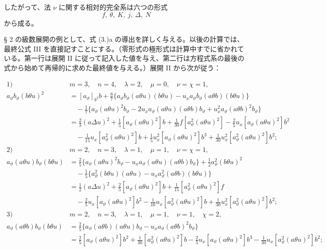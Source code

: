 \documentclass[11pt]{jlreq}
\newcommand{\A}{\Delta}
\begin{document}
したがって、法 $\nu$ に関する相対的完全系は六つの形式
\[
f,\ \theta,\ K,\ j,\ \A,\ N
\]
から成る。

§ 2 の級数展開の例として、式 (3.)a の導出を詳しく与える。以後の計算では、最終公式 III を直接記すことにする。（零形式の極形式は計算中すでに省かれている。第一行は展開 II に従って記入した値を与え、第二行は方程式系の最後の式から始めて再帰的に求めた最終値を与える。）展開 II から次が従う：

\begin{align*}
\text{1)}\quad&m=3,\quad n=4,\quad \lambda=2,\quad \mu=0,\quad \nu=\chi=1,\\
a_\vartheta b_\vartheta(b\theta u)^2
&=[a_\vartheta]_{b^2}b+\frac67\{a_\vartheta b_\vartheta(a\theta u)(b\theta u)-u_xa_\vartheta b_\vartheta(a\theta b)(b\theta u)\}\\
&\quad-\frac17\{a_\vartheta(a\theta u)^2b_\vartheta-2u_xa_\vartheta(a\theta u)(a\theta b)b_\vartheta+u_x^2a_\vartheta(a\theta b)^2b_\vartheta\}\\
&=\frac23(a\Delta u)^2+\frac15[a_\vartheta(a\theta u)^2]b+\frac1{30}f[a_\vartheta^2(a\theta u)^2]-\frac25u_x[a_\vartheta(a\theta u)^2]b^2\\
&\quad-\frac1{15}u_x[a_\vartheta^2(a\theta u)^2]b+\frac15u_x^2[a_\vartheta(a\theta u)^2]b^3+\frac1{30}u_x^2[a_\vartheta^2(a\theta u)^2]b^2;\\[.6em]
\text{2)}\quad&m=2,\quad n=3,\quad \lambda=1,\quad \mu=1,\quad \nu=\chi=1,\\
a_\vartheta(a\theta u)b_\vartheta(b\theta u)
&=\frac25\{a_\vartheta(a\theta u)^2b_\vartheta-u_xa_\vartheta(a\theta u)(a\theta b)b_\vartheta\}+\frac12a_\vartheta^2(b\theta u)^2\\
&\quad-\frac15\{a_\vartheta^2(b\theta u)(a\theta u)-u_xa_\vartheta^2(a\theta b)(b\theta u)\}\\
&=\frac12(a\Delta u)^2+\frac25[a_\vartheta(a\theta u)^2]b+\frac1{15}[a_\vartheta^2(a\theta u)^2]f\\
&\quad-\frac25u_x[a_\vartheta(a\theta u)^2]b^2-\frac1{10}u_x[a_\vartheta^2(a\theta u)^2]b+\frac1{30}u_x^2[a_\vartheta^2(a\theta u)^2]b^2;\\[.6em]
\text{3)}\quad&m=2,\quad n=3,\quad \lambda=1,\quad \mu=1,\quad \nu=1,\quad \chi=2,\\
a_\vartheta(a\theta b)b_\vartheta(b\theta u)
&=\frac25\{a_\vartheta(a\theta b)(a\theta u)b_\vartheta-u_xa_\vartheta(a\theta b)^2b_\vartheta\}\\
&=\frac25[a_\vartheta(a\theta u)^2]b^2+\frac1{30}[a_\vartheta^2(a\theta u)^2]b-\frac25u_x[a_\vartheta(a\theta u)^2]b^3-\frac1{30}u_x[a_\vartheta^2(a\theta u)^2]b^2;\\[.6em]

\end{align*}
\end{document}
